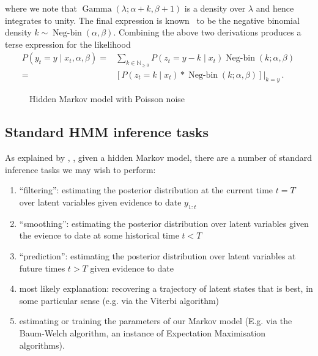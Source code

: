 \documentclass[twoside, 11pt]{article}
\DeclareMathOperator*{\gammad}{Gamma}
\DeclareMathOperator*{\negbind}{Neg-bin}
\newcommand{\nonnegint}[0] {\mathbb{N}_{\geq 0}}
\begin{document}
where we note that $\gammad(\lambda ; \alpha+k, \beta+1)$ is a density over $\lambda$ and hence integrates to unity. The final expression is known~\citep{gelman2013bayesian} to be the negative binomial density $k \sim \negbind\left(\alpha, \beta\right)$. Combining the above two derivations produces a terse expression for the likelihood
\begin{align}
P(y_t=y \mid x_t, \alpha, \beta)
= & \sum_{k \in \nonnegint} P(z_t = y-k \mid x_t) \negbind\left(k ; \alpha, \beta\right) \, \nonumber \\
= & \left[ P(z_t=k \mid x_t) * \negbind(k ; \alpha, \beta) \right] \Bigr \rvert_{k=y} \, .
\end{align}


\begin{figure}
\caption{Hidden Markov model with Poisson noise}
\label{fig:hmmpoisson}
\end{figure}

\subsection{Standard HMM inference tasks}

As explained by \citet{rabiner1989tutorial}, \citet*{russell2002artificial}, given a hidden Markov model, there are a number of standard inference tasks we may wish to perform:

\begin{enumerate}
\item ``filtering'': estimating the posterior distribution at the current time $t=T$ over latent variables given evidence to date $y_{1:t}$
\item ``smoothing'': estimating the posterior distribution over latent variables given the evience to date at some historical time $t<T$
\item ``prediction'': estimating the posterior distribution over latent variables at future times $t>T$ given evidence to date
\item most likely explanation: recovering a trajectory of latent states that is best, in some particular sense (e.g. via the Viterbi algorithm)
\item estimating or training the parameters of our Markov model (E.g. via the Baum-Welch algorithm, an instance of Expectation Maximisation algorithms).
\end{enumerate}
\end{document}
